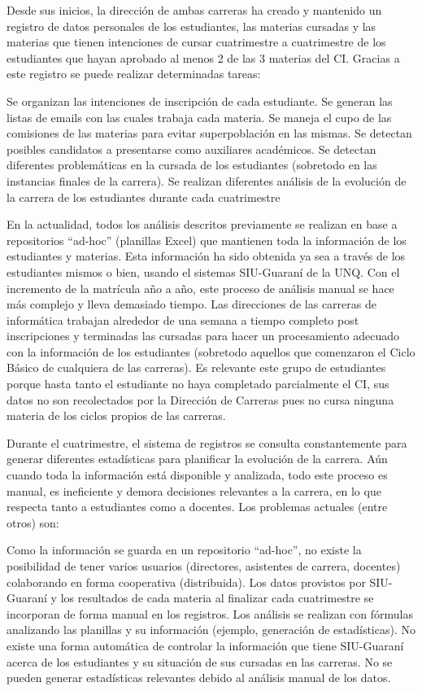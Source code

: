 Desde sus inicios, la dirección de ambas carreras ha creado y mantenido un registro de datos personales de los estudiantes, las materias cursadas y las materias que tienen intenciones de cursar cuatrimestre a cuatrimestre de los estudiantes que hayan aprobado al menos 2 de las 3 materias del CI. Gracias a este registro se puede realizar determinadas tareas: 
\begin{outline}
    \1 Se organizan las intenciones de inscripción de cada estudiante.
    \1 Se generan las listas de emails con las cuales trabaja cada materia.
    \1 Se maneja el cupo de las comisiones de las materias para evitar superpoblación en las mismas.
    \1 Se detectan posibles candidatos a presentarse como auxiliares académicos.
    \1 Se detectan diferentes problemáticas en la cursada de los estudiantes (sobretodo en las instancias finales de la carrera).
    \1 Se realizan diferentes análisis de la evolución de la carrera de los estudiantes durante cada cuatrimestre
\end{outline}

En la actualidad, todos los análisis descritos previamente se realizan en base a repositorios “ad-hoc” (planillas Excel) que mantienen toda la información de los estudiantes y materias. Esta información ha sido obtenida ya sea a través de los estudiantes mismos o bien, usando el sistemas SIU-Guaraní de la UNQ.
Con el incremento de la matrícula año a año, este proceso de análisis manual se hace más complejo y lleva demasiado tiempo. Las direcciones de las carreras de informática trabajan alrededor de una semana a tiempo completo post inscripciones y terminadas las cursadas para hacer un procesamiento adecuado con  la información de los estudiantes (sobretodo aquellos que comenzaron el Ciclo Básico de cualquiera de las carreras). Es relevante este grupo de estudiantes porque hasta tanto el estudiante no haya completado parcialmente el CI, sus datos no son recolectados por la Dirección de Carreras pues no cursa ninguna materia de los ciclos propios de las carreras.

Durante el cuatrimestre, el sistema de registros se consulta constantemente para generar diferentes estadísticas para planificar la evolución de la carrera. Aún cuando toda la información está disponible y analizada, todo este proceso es manual, es ineficiente y demora decisiones relevantes a la carrera, en lo que respecta tanto a estudiantes como a docentes. Los problemas actuales (entre otros) son:
\begin{outline}
\1 Como la información se guarda en un repositorio “ad-hoc”, no existe la posibilidad de tener varios usuarios (directores, asistentes de carrera, docentes) colaborando en forma cooperativa (distribuida).
\1 Los datos provistos por SIU-Guaraní y los resultados de cada materia al finalizar cada cuatrimestre se incorporan de forma manual en los registros.
\1 Los análisis se realizan con fórmulas analizando las planillas y su información (ejemplo, generación de estadísticas).
\1 No existe una forma automática de controlar la información que tiene SIU-Guaraní acerca de los estudiantes y su situación de sus cursadas en las carreras.
\1 No se pueden generar estadísticas relevantes debido al análisis manual de los datos.
\end{outline}

